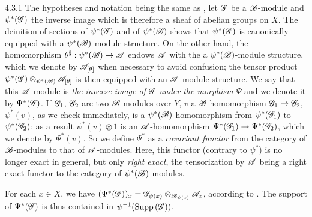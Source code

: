 \begin{env}{4.3.1}
\label{env-0.4.3.1}
The hypotheses and notation being the same as , let $\mathscr{G}$ be a
$\mathscr{B}$-module and $\psi^*(\mathscr{G})$ the inverse image  which is therefore
a sheaf of abelian groups on $X$. The deinition of sections of $\psi^*(\mathscr{G})$ and of
$\psi^*(\mathscr{B})$  shows that $\psi^*(\mathscr{G})$ is canonically equipped with
a $\psi^*(\mathscr{B})$-module structure. On the other hand, the homomorphism
$\theta^\sharp:\psi^*(\mathscr{B})\to\mathscr{A}$ endows $\mathscr{A}$ with the a $\psi^*(\mathscr{B})$-module
structure, which we denote by $\mathscr{A}_{[\theta]}$ when necessary to avoid confusion; the
tensor product $\psi^*(\mathscr{G})\otimes_{\psi^*(\mathscr{B})}\mathscr{A}_{[\theta]}$ is then equipped
with an $\mathscr{A}$-module structure. We say that this $\mathscr{A}$-module is \emph{the inverse
image of $\mathscr{G}$ under the morphism $\Psi$}
and we denote it by $\Psi^*(\mathscr{G})$. If $\mathscr{G}_1$, $\mathscr{G}_2$ are two $\mathscr{B}$-modules over
$Y$, $v$ a $\mathscr{B}$-homomorphism $\mathscr{G}_1\to\mathscr{G}_2$, $\psi^*(v)$, as we check immediately,
is a $\psi^*(\mathscr{B})$-homomorphism from $\psi^*(\mathscr{G}_1)$ to $\psi^*(\mathscr{G}_2)$; as a result
$\psi^*(v)\otimes 1$ is an $\mathscr{A}$-homomorphism $\Psi^*(\mathscr{G}_1)\to\Psi^*(\mathscr{G}_2)$, which
we denote by $\Psi^*(v)$. So we define $\Psi^*$ as a \emph{covariant functor} from the
category of $\mathscr{B}$-modules to that of $\mathscr{A}$-modules. Here, this functor (contrary to
$\psi^*$) is no longer exact in general, but only \emph{right exact}, the tensorization by
$\mathscr{A}$ being a right exact functor to the category of $\psi^*(\mathscr{B})$-modules.

For each $x\in X$, we have
$(\Psi^*(\mathscr{G}))_x=\mathscr{G}_{\psi(x)}\otimes_{\mathscr{B}_{\psi(x)}}\mathscr{A}_x$, according to
. The support of $\Psi^*(\mathscr{G})$ is thus contained in
$\psi^{-1}({\mathop{\mathrm{Supp}}\nolimits}\,(\mathscr{G}))$.
\end{env}

